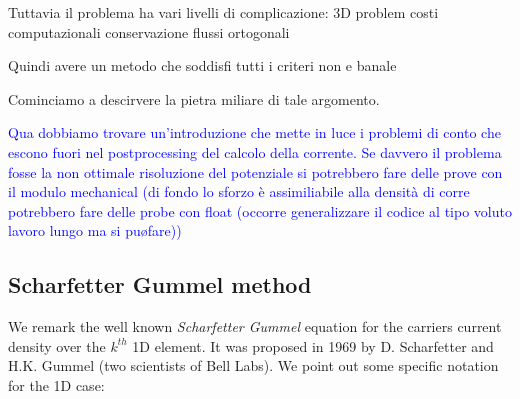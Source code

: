 Tuttavia il problema ha vari livelli di complicazione:
3D problem
costi computazionali
conservazione flussi ortogonali

Quindi avere un metodo che soddisfi tutti i criteri non e banale

Cominciamo a descirvere la pietra miliare di tale argomento. 
 
 
\textcolor{blue}{Qua dobbiamo trovare un'introduzione che mette in luce i problemi di conto che escono fuori nel postprocessing del calcolo della corrente. Se davvero il problema fosse la non ottimale risoluzione del potenziale si potrebbero fare delle prove con il modulo mechanical (di fondo lo sforzo \`e assimiliabile alla densit\`a di corre potrebbero fare delle probe con float (occorre generalizzare il codice al tipo voluto lavoro lungo ma si pu\o fare))}

\subsection{Scharfetter Gummel method}

We remark the well known \textit{Scharfetter Gummel} equation for the carriers current density over the $k^{th}$ 1D element. It was proposed in 1969 by D. Scharfetter and H.K. Gummel (two scientists of Bell Labs). We point out some specific notation for the 1D case:

